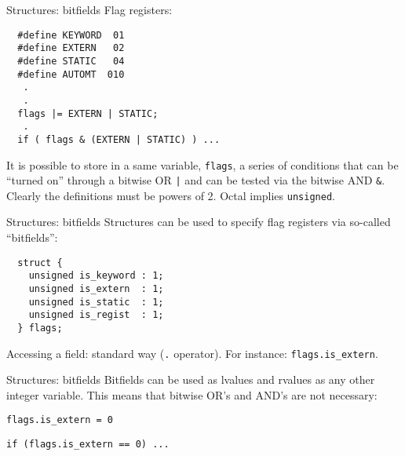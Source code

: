 \begin{frame}[fragile]{Structures: bitfields}
Flag registers:


\vspace{20pt}

\begin{tt}
\begin{verbatim}
  #define KEYWORD  01
  #define EXTERN   02
  #define STATIC   04
  #define AUTOMT  010
   .
   .
  flags |= EXTERN | STATIC;
   .
  if ( flags & (EXTERN | STATIC) ) ...
\end{verbatim}
\end{tt}


\vspace{20pt}

It is possible to store in a same variable, {\tt flags}, a series
of conditions that can be ``turned on'' through a bitwise OR
{\tt |} and can be tested via the bitwise
AND {\tt \&}. Clearly the definitions must be powers of 2.
Octal implies {\tt unsigned}.



\end{frame}
\begin{frame}[fragile]{Structures: bitfields}
Structures can be used to specify flag registers via so-called
``bitfields'':


\vspace{20pt}

\begin{tt}
\begin{verbatim}
  struct {
    unsigned is_keyword : 1;
    unsigned is_extern  : 1;
    unsigned is_static  : 1;
    unsigned is_regist  : 1;
  } flags;
\end{verbatim}
\end{tt}


\vspace{20pt}

Accessing a field: standard way ({\tt .} operator). For instance:
{\tt flags.is\_extern}.

\end{frame}
\begin{frame}[fragile]{Structures: bitfields}
Bitfields can be used as lvalues and rvalues as any other
integer variable. This means that bitwise OR's and AND's
are not necessary:


\vspace{20pt}

\begin{center}\tt flags.is\_extern = 0\end{center}
\begin{center}\tt if (flags.is\_extern == 0) ...\end{center}


\end{frame}
